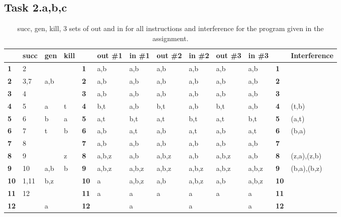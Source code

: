 \documentclass[11pt,a4paper]{article}
\theoremstyle{plain}
\theoremstyle{definition}
\theoremstyle{remark}
\numberwithin{equation}{section}
\begin{document}
\subsection*{Task 2.a,b,c}
\begin{table}[H]
	\centering
	\begin{tabular}{l|l|l|l|l|l|l|l|l|l|l|l|l}
		\textbf{}   & succ & gen & kill & \textbf{}   & out \#1 & in \#1 & out \#2 & in \#2 & out \#3 & in \#3 & \textbf{}   & Interference \\ \hline
		\textbf{1}  & 2    &     &      & \textbf{1}  & a,b     & a,b    & a,b     & a,b    & a,b     & a,b    & \textbf{1}  &              \\ \hline
		\textbf{2}  & 3,7  & a,b &      & \textbf{2}  & a,b     & a,b    & a,b     & a,b    & a,b     & a,b    & \textbf{2}  &              \\ \hline
		\textbf{3}  & 4    &     &      & \textbf{3}  & a,b     & a,b    & a,b     & a,b    & a,b     & a,b    & \textbf{3}  &              \\ \hline
		\textbf{4}  & 5    & a   & t    & \textbf{4}  & b,t     & a,b    & b,t     & a,b    & b,t     & a,b    & \textbf{4}  & (t,b)        \\ \hline
		\textbf{5}  & 6    & b   & a    & \textbf{5}  & a,t     & b,t    & a,t     & b,t    & a,t     & b,t    & \textbf{5}  & (a,t)        \\ \hline
		\textbf{6}  & 7    & t   & b    & \textbf{6}  & a,b     & a,t    & a,b     & a,t    & a,b     & a,t    & \textbf{6}  & (b,a)        \\ \hline
		\textbf{7}  & 8    &     &      & \textbf{7}  & a,b     & a,b    & a,b     & a,b    & a,b     & a,b    & \textbf{7}  &              \\ \hline
		\textbf{8}  & 9    &     & z    & \textbf{8}  & a,b,z   & a,b    & a,b,z   & a,b    & a,b,z   & a,b    & \textbf{8}  & (z,a),(z,b)  \\ \hline
		\textbf{9}  & 10   & a,b & b    & \textbf{9}  & a,b,z   & a,b,z  & a,b,z   & a,b,z  & a,b,z   & a,b,z  & \textbf{9}  & (b,a),(b,z)  \\ \hline
		\textbf{10} & 1,11 & b,z &      & \textbf{10} & a       & a,b,z  & a,b     & a,b,z  & a,b     & a,b,z  & \textbf{10} &              \\ \hline
		\textbf{11} & 12   &     &      & \textbf{11} & a       & a      & a       & a      & a       & a      & \textbf{11} &              \\ \hline
		\textbf{12} &      & a   &      & \textbf{12} &         & a      &         & a      &         & a      & \textbf{12} &              \\
	\end{tabular}
	\caption{succ, gen, kill, 3 sets of out and in for all instructions and interference for the program given in the assignment.}
	\label{tab:liveliness_analysis}
\end{table}
\end{document}
